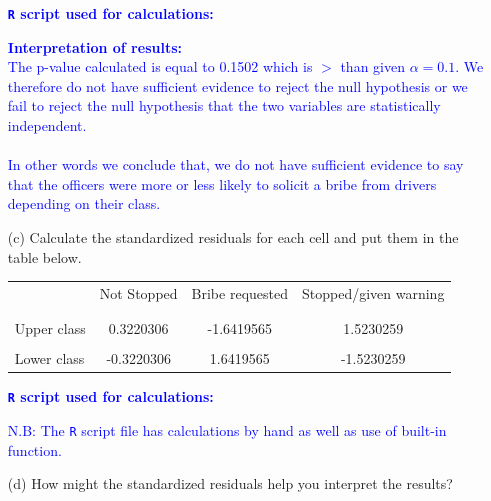 \documentclass[12pt,letterpaper]{article}
\begin{document}
\begin{enumerate}
\vspace{0.2cm}
\textcolor{blue}{
\textbf{\texttt{R} script used for calculations:}
}



\vspace*{0.5cm}
\textcolor{blue}{
\textbf{Interpretation of results:}\\
The p-value calculated is equal to 0.1502 which is $>$ than given $\alpha = 0.1$. We therefore do not have sufficient evidence to reject the null hypothesis or we fail to reject the null hypothesis that the two variables are statistically independent.\\
\\In other words we conclude that, we do not have sufficient evidence to say that the officers were more or less likely to solicit a bribe from drivers depending on their class.
}
\vspace{0.5cm}
	\item [(c)] Calculate the standardized residuals for each cell and put them in the table below.
	\vspace{0.5cm}
	
	\begin{table}[h]
		\centering
		\begin{tabular}{l | c c c }
			& Not Stopped & Bribe requested & Stopped/given warning \\
			\\[-1.8ex] 
			\hline \\[-1.8ex]
			Upper class & 0.3220306 & -1.6419565 & 1.5230259 \\
			\\
			Lower class & -0.3220306 & 1.6419565 & -1.5230259 \\
			
		\end{tabular}
	\end{table}

\textcolor{blue}{
\textbf{\texttt{R} script used for calculations:}
}



\textcolor{blue}{
N.B: The \texttt{R} script file has calculations by hand as well as use of built-in function.
}

\pagebreak

	\item [(d)] How might the standardized residuals help you interpret the results?


\end{enumerate}
\end{document}
